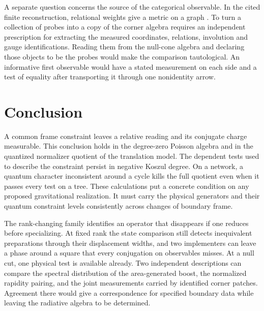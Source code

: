 \documentclass[11pt,letterpaper]{article}
\begin{document}
A separate question concerns the source of the categorical observable. In the cited finite
reconstruction, relational weights give a metric on a graph \cite{rep}. To turn a collection
of probes into a copy of the corner algebra requires an independent prescription for
extracting the measured coordinates, relations, involution and gauge identifications. Reading
them from the null-cone algebra and declaring those objects to be the probes would make the
comparison tautological. An informative first observable would have a stated measurement on
each side and a test of equality after transporting it through one nonidentity arrow.

\section{Conclusion}
A common frame constraint leaves a relative reading and its conjugate charge measurable. This
conclusion holds in the degree-zero Poisson algebra and in the quantized normalizer quotient
of the translation model. The dependent tests used to describe the constraint persist in
negative Koszul degree. On a network, a quantum character inconsistent around a cycle kills
the full quotient even when it passes every test on a tree. These calculations put a concrete
condition on any proposed gravitational realization. It must carry the physical generators and
their quantum constraint levels consistently across changes of boundary frame.

The rank-changing family identifies an operator that disappears if one reduces before
specializing. At fixed rank the state comparison still detects inequivalent preparations
through their displacement widths, and two implementers can leave a phase around a square
that every conjugation on observables misses. At a null cut, one physical test is available
already. Two independent descriptions can compare the spectral distribution of the
area-generated boost, the normalized rapidity pairing, and the joint measurements carried by
identified corner patches. Agreement there would give a correspondence for specified
boundary data while leaving the radiative algebra to be determined.
\end{document}
